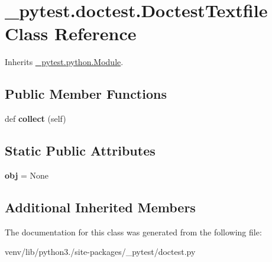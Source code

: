 \hypertarget{class__pytest_1_1doctest_1_1_doctest_textfile}{}\section{\+\_\+pytest.\+doctest.\+Doctest\+Textfile Class Reference}
\label{class__pytest_1_1doctest_1_1_doctest_textfile}


Inherits \hyperlink{class__pytest_1_1python_1_1_module}{\+\_\+pytest.\+python.\+Module}.

\subsection*{Public Member Functions}
\begin{DoxyCompactItemize}
\item 
\mbox{\label{class__pytest_1_1doctest_1_1_doctest_textfile_ad90e13ab6fbe90132d9b86d3af7ae1e8}} 
def {\bfseries collect} (self)
\end{DoxyCompactItemize}
\subsection*{Static Public Attributes}
\begin{DoxyCompactItemize}
\item 
\mbox{\label{class__pytest_1_1doctest_1_1_doctest_textfile_a6a82c7a6ecdf622661e0fd7dee2d73dc}} 
{\bfseries obj} = None
\end{DoxyCompactItemize}
\subsection*{Additional Inherited Members}


The documentation for this class was generated from the following file\+:\begin{DoxyCompactItemize}
\item 
venv/lib/python3./site-\/packages/\+\_\+pytest/doctest.\+py\end{DoxyCompactItemize}

